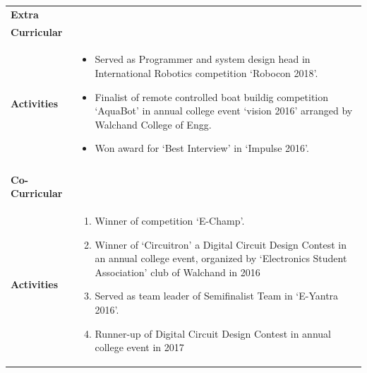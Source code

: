 \documentclass[a4paper,11pt,oneside]{article}
\begin{document}
\begin{tabular}{@{} p{} p{\textwidth}}
 \textbf{\large{Extra}} & \\
 \textbf{\large{Curricular}} & \\
 \textbf{\large{Activities}}
    & \vspace{-4em}
      \begin{itemize}
        \setlength\itemsep{0.1em}
        \item Served as Programmer and system design head in International Robotics competition `Robocon 2018'.
        \item Finalist of remote controlled boat buildig competition `AquaBot' in annual college event `vision 2016' arranged by Walchand College of Engg.
        \item Won award for `Best Interview' in `Impulse 2016'.
    \end{itemize}  \\ \\
 \textbf{\large{Co-Curricular}} & \\
 \textbf{\large{Activities}}
    & \vspace{-3em}
      \begin{enumerate}
        \setlength\itemsep{0.1em}
        \item Winner of  competition `E-Champ'.
        \item Winner of `Circuitron' a Digital Circuit Design Contest in an annual college event, organized by `Electronics Student Association' club of Walchand in 2016
        \item Served as team leader of Semifinalist Team in `E-Yantra 2016'.
        \item Runner-up of Digital Circuit Design Contest in annual college event in 2017
    \end{enumerate}
    \vspace{1em}\\
\end{tabular}
\end{document}
